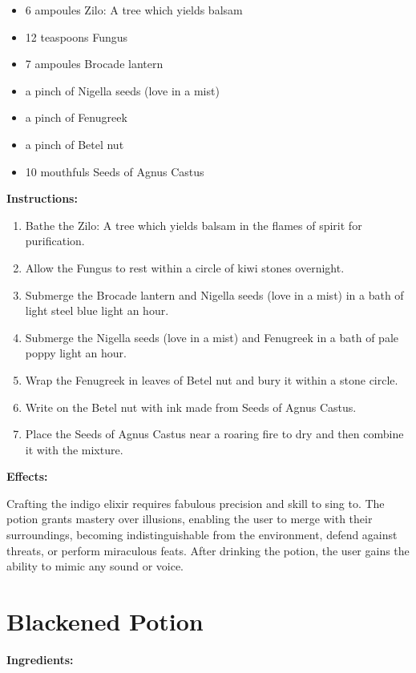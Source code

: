 \documentclass{article}
\begin{document}
\begin{itemize}
  \item 6 ampoules Zilo: A tree which yields balsam
  \item 12 teaspoons Fungus
  \item 7 ampoules Brocade lantern
  \item a pinch of Nigella seeds (love in a mist)
  \item a pinch of Fenugreek
  \item a pinch of Betel nut
  \item 10 mouthfuls Seeds of Agnus Castus
\end{itemize}

\textbf{Instructions:}

\begin{enumerate}
  \item Bathe the Zilo: A tree which yields balsam in the flames of spirit for purification.
  \item Allow the Fungus to rest within a circle of kiwi stones overnight.
  \item Submerge the Brocade lantern and Nigella seeds (love in a mist) in a bath of light steel blue light an hour.
  \item Submerge the Nigella seeds (love in a mist) and Fenugreek in a bath of pale poppy light an hour.
  \item Wrap the Fenugreek in leaves of Betel nut and bury it within a stone circle.
  \item Write on the Betel nut with ink made from Seeds of Agnus Castus.
  \item Place the Seeds of Agnus Castus near a roaring fire to dry and then combine it with the mixture.
\end{enumerate}

\textbf{Effects:}

Crafting the indigo elixir requires fabulous precision and skill to sing to. The potion grants mastery over illusions, enabling the user to merge with their surroundings, becoming indistinguishable from the environment, defend against threats, or perform miraculous feats. After drinking the potion, the user gains the ability to mimic any sound or voice.

\newpage
\section*{Blackened Potion}

\textbf{Ingredients:}
\end{document}
